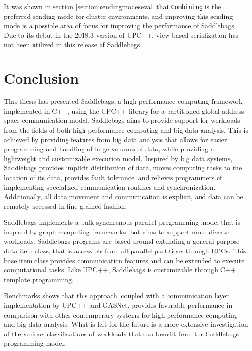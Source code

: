 \documentclass{uit-report}
\begin{document}
It was shown in section \ref{section:sendingmodeseval} that \texttt{Combining} is the preferred sending mode for cluster environments, and improving this sending mode is a possible area of focus for improving the performance of Saddlebags. Due to its debut in the 2018.3 version of UPC++, view-based serialization has not been utilized in this release of Saddlebags.





\chapter{Conclusion}
This thesis has presented Saddlebags, a high performance computing framework implemented in C++, using the UPC++ library for a partitioned global address space communication model. Saddlebags aims to provide support for workloads from the fields of both high performance computing and big data analysis. This is achieved by providing features from big data analysis that allows for easier programming and handling of large volumes of data, while providing a lightweight and customizable execution model. Inspired by big data systems, Saddlebags provides implicit distribution of data, moves computing tasks to the location of its data, provides fault tolerance, and relieves programmers of implementing specialized communication routines and synchronization. Additionally, all data movement and communication is explicit, and data can be remotely accessed in fine-grained fashion.

Saddlebags implements a bulk synchronous parallel programming model that is inspired by graph computing frameworks, but aims to support more diverse workloads. Saddlebags programs are based around extending a general-purpose data item class, that is accessible from all parallel partitions through RPCs. This base item class provides communication features and can be extended to execute computational tasks. Like UPC++, Saddlebags is customizable through C++ template programming.

Benchmarks shows that this approach, coupled with a communication layer implementation by UPC++ and GASNet, provides favorable performance in comparison with other contemporary systems for high performance computing and big data analysis. What is left for the future is a more extensive investigation of the various classifications of workloads that can benefit from the Saddlebags programming model.
\end{document}
